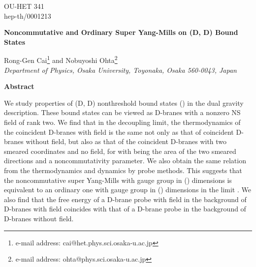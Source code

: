 \documentclass[a4paper,12pt]{article}
\begin{document}
\topmargin 0pt
\oddsidemargin 0mm

\renewcommand{\thefootnote}{\fnsymbol{footnote}}
\begin{titlepage}
\begin{flushright}
OU-HET 341 \\
hep-th/0001213
\end{flushright}

\vspace{5mm}
\begin{center}
{\Large \bf Noncommutative and Ordinary Super Yang-Mills on (D\coordHE{}, D\coordHE{})
Bound States}
\vspace{10mm}

{\large
Rong-Gen Cai\footnote{e-mail address: cai@het.phys.sci.osaka-u.ac.jp} and
Nobuyoshi Ohta\footnote{e-mail address: ohta@phys.sci.osaka-u.ac.jp}} \\
\vspace{8mm}
{\em Department of Physics, Osaka University,
Toyonaka, Osaka 560-0043, Japan}

\end{center}
\vspace{5mm}
\centerline{{\bf{Abstract}}}
\vspace{5mm}

We study properties of (D\coordHE{}, D\coordHE{}) nonthreshold bound states
(\coordHE{}) in the dual gravity description. These bound
states can be viewed as D\coordHE{}-branes with a nonzero NS \coordHE{} field of rank
two. We find that in the decoupling limit, the thermodynamics of the \coordHE{}
coincident D\coordHE{}-branes with \coordHE{} field is the same not only as that of \coordHE{}
coincident D\coordHE{}-branes without \coordHE{} field, but also as that of the \coordHE{}
coincident D\coordHE{}-branes with two smeared coordinates and no \coordHE{} field,
for \coordHE{} with \coordHE{} being
the area of the two smeared directions and \coordHE{} a noncommutativity
parameter. We also obtain the same relation from the thermodynamics and
dynamics by probe methods. This suggests that the noncommutative super
Yang-Mills with gauge group \coordHE{} in (\coordHE{}) dimensions is equivalent to
an ordinary one with gauge group \coordHE{} in (\coordHE{}) dimensions in the
limit \coordHE{}. We also find that the free energy
of a D\coordHE{}-brane probe with \coordHE{} field in the background of D\coordHE{}-branes with
\coordHE{} field coincides with that of a D\coordHE{}-brane probe in the background of
D\coordHE{}-branes without \coordHE{} field.

\end{titlepage}
\end{document}

